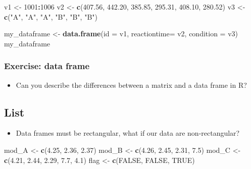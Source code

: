 \documentclass[
]{book}
\newenvironment{Shaded}{\begin{snugshade}}{\end{snugshade}}
\newcommand{\AttributeTok}[1]{\textcolor[rgb]{0.13,0.29,0.53}{#1}}
\newcommand{\ConstantTok}[1]{\textcolor[rgb]{0.56,0.35,0.01}{#1}}
\newcommand{\DecValTok}[1]{\textcolor[rgb]{0.00,0.00,0.81}{#1}}
\newcommand{\FloatTok}[1]{\textcolor[rgb]{0.00,0.00,0.81}{#1}}
\newcommand{\FunctionTok}[1]{\textcolor[rgb]{0.13,0.29,0.53}{\textbf{#1}}}
\newcommand{\NormalTok}[1]{#1}
\newcommand{\OtherTok}[1]{\textcolor[rgb]{0.56,0.35,0.01}{#1}}
\newcommand{\SpecialCharTok}[1]{\textcolor[rgb]{0.81,0.36,0.00}{\textbf{#1}}}
\newcommand{\StringTok}[1]{\textcolor[rgb]{0.31,0.60,0.02}{#1}}
\providecommand{\tightlist}{%
  \setlength{\itemsep}{0pt}\setlength{\parskip}{0pt}}
\begin{document}
\begin{Shaded}
\begin{Highlighting}[]
\NormalTok{v1 }\OtherTok{\textless{}{-}} \DecValTok{1001}\SpecialCharTok{:}\DecValTok{1006}
\NormalTok{v2 }\OtherTok{\textless{}{-}} \FunctionTok{c}\NormalTok{(}\FloatTok{407.56}\NormalTok{, }\FloatTok{442.20}\NormalTok{, }\FloatTok{385.85}\NormalTok{, }\FloatTok{295.31}\NormalTok{, }\FloatTok{408.10}\NormalTok{, }\FloatTok{280.52}\NormalTok{)}
\NormalTok{v3 }\OtherTok{\textless{}{-}} \FunctionTok{c}\NormalTok{(}\StringTok{"A"}\NormalTok{, }\StringTok{"A"}\NormalTok{, }\StringTok{"A"}\NormalTok{, }\StringTok{"B"}\NormalTok{, }\StringTok{"B"}\NormalTok{, }\StringTok{"B"}\NormalTok{)}

\NormalTok{my\_dataframe }\OtherTok{\textless{}{-}} \FunctionTok{data.frame}\NormalTok{(}\AttributeTok{id =}\NormalTok{ v1, }\AttributeTok{reactiontime=}\NormalTok{ v2, }\AttributeTok{condition =}\NormalTok{ v3)}
\NormalTok{my\_dataframe}
\end{Highlighting}
\end{Shaded}

\subsubsection{Exercise: data frame}\label{exercise-data-frame}

\begin{itemize}
\tightlist
\item
  Can you describe the differences between a matrix and a data frame in R?
\end{itemize}

\subsection{List}\label{list}

\begin{itemize}
\tightlist
\item
  Data frames must be rectangular, what if our data are non-rectangular?
\end{itemize}

\begin{Shaded}
\begin{Highlighting}[]
\NormalTok{mod\_A }\OtherTok{\textless{}{-}} \FunctionTok{c}\NormalTok{(}\FloatTok{4.25}\NormalTok{, }\FloatTok{2.36}\NormalTok{, }\FloatTok{2.37}\NormalTok{)}
\NormalTok{mod\_B }\OtherTok{\textless{}{-}} \FunctionTok{c}\NormalTok{(}\FloatTok{4.26}\NormalTok{, }\FloatTok{2.45}\NormalTok{, }\FloatTok{2.31}\NormalTok{, }\FloatTok{7.5}\NormalTok{)}
\NormalTok{mod\_C }\OtherTok{\textless{}{-}} \FunctionTok{c}\NormalTok{(}\FloatTok{4.21}\NormalTok{, }\FloatTok{2.44}\NormalTok{, }\FloatTok{2.29}\NormalTok{, }\FloatTok{7.7}\NormalTok{, }\FloatTok{4.1}\NormalTok{)}
\NormalTok{flag }\OtherTok{\textless{}{-}} \FunctionTok{c}\NormalTok{(}\ConstantTok{FALSE}\NormalTok{, }\ConstantTok{FALSE}\NormalTok{, }\ConstantTok{TRUE}\NormalTok{)}
\end{Highlighting}
\end{Shaded}
\end{document}
